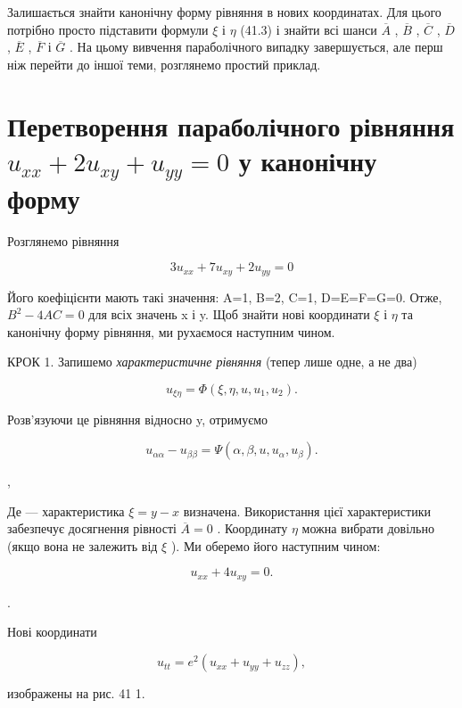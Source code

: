 \documentclass[
  ukrainian,
]{article}
\begin{document}
Залишається знайти канонічну форму рівняння в нових координатах. Для
цього потрібно просто підставити формули \(\xi\) і \(\eta\) (41.3) і
знайти всі шанси \(\overline{A}\) , \(\overline{B}\) , \(\overline{C}\)
, \(\overline{D}\) , \(\overline{E}\) , \(\overline{F}\) і
\(\overline{G}\) . На цьому вивчення параболічного випадку завершується,
але перш ніж перейти до іншої теми, розглянемо простий приклад.

\section{\texorpdfstring{Перетворення параболічного рівняння
\(u_{xx} + 2u_{xy} + u_{yy} = 0\) у канонічну
форму}{Перетворення параболічного рівняння u\_\{xx\} + 2u\_\{xy\} + u\_\{yy\} = 0 у канонічну форму}}\label{ux43fux435ux440ux435ux442ux432ux43eux440ux435ux43dux43dux44f-ux43fux430ux440ux430ux431ux43eux43bux456ux447ux43dux43eux433ux43e-ux440ux456ux432ux43dux44fux43dux43dux44f-u_xx-2u_xy-u_yy-0-ux443-ux43aux430ux43dux43eux43dux456ux447ux43dux443-ux444ux43eux440ux43cux443}

Розглянемо рівняння

\[
3u_{xx} + 7u_{xy} + 2u_{yy} = 0
\]

Його коефіцієнти мають такі значення: A=1, B=2, C=1, D=E=F=G=0. Отже,
\(B^2-4AC=0\) для всіх значень x і y. Щоб знайти нові координати \(\xi\)
і \(\eta\) та канонічну форму рівняння, ми рухаємося наступним чином.

КРОК 1. Запишемо \emph{характеристичне рівняння} (тепер лише одне, а не
два)

\[
u_{\xi\eta} = \Phi(\xi, \eta, u, u_1, u_2).
\]

Розв'язуючи це рівняння відносно y, отримуємо

\[
u_{\alpha\alpha} - u_{\beta\beta} = \Psi(\alpha, \beta, u, u_{\alpha}, u_{\beta}).
\]

,

Де --- характеристика \(\xi = y - x\) визначена. Використання цієї
характеристики забезпечує досягнення рівності \(\overline{A} = 0\) .
Координату \(\eta\) можна вибрати довільно (якщо вона не залежить від
\(\xi\) ). Ми оберемо його наступним чином:

\[
u_{xx} + 4u_{xy} = 0.
\]

.

Нові координати

\[
u_{tt} = e^{2} (u_{xx} + u_{yy} + u_{zz}),
\]

изображены на рис. 41 1.
\end{document}
